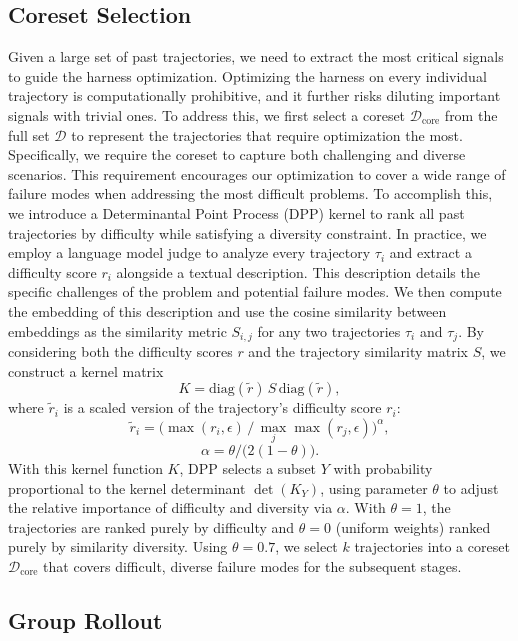 \subsection{Coreset Selection}

Given a large set of past trajectories, we need to extract the most critical signals to guide the harness optimization.
Optimizing the harness on every individual trajectory is computationally prohibitive, and it further risks diluting important signals with trivial ones.
To address this, we first select a coreset $\mathcal{D}_{\mathrm{core}}$ from the full set $\mathcal{D}$ to represent the trajectories that require optimization the most.
Specifically, we require the coreset to capture both challenging and diverse scenarios.
This requirement encourages our optimization to cover a wide range of failure modes when addressing the most difficult problems.
To accomplish this, we introduce a Determinantal Point Process (DPP) kernel \citep{kulesza2012dpp} to rank all past trajectories by difficulty while satisfying a diversity constraint.
In practice, we employ a language model judge to analyze every trajectory $\tau_i$ and extract a difficulty score $r_i$ alongside a textual description.
This description details the specific challenges of the problem and potential failure modes.
We then compute the embedding of this description and use the cosine similarity between embeddings as the similarity metric $S_{i,j}$ for any two trajectories $\tau_i$ and $\tau_j$.
By considering both the difficulty scores $r$ and the trajectory similarity matrix $S$, we construct a kernel matrix
\[
    K = \mathrm{diag}( \widetilde{r})\,S\,\mathrm{diag}( \widetilde{r}),
\]
where  $\widetilde{r}_i$ is a scaled version of the trajectory's difficulty score $r_i$:
\[
\widetilde{r}_i = \big(\max(r_i,\epsilon)\,/\,\max_j \max(r_j,\epsilon)\big)^{\alpha},
\]
\[
\alpha = \theta/\big(2(1-\theta)\big).
\]
With this kernel function $K$, DPP selects a subset $Y$ with probability proportional to the kernel determinant $\det(K_Y)$, using parameter $\theta$ to adjust the relative importance of difficulty and diversity via $\alpha$. With $\theta = 1$, the trajectories are ranked purely by difficulty and $\theta = 0$ (uniform weights) ranked purely by similarity diversity.
Using $\theta = 0.7$, we select $k$ trajectories into a coreset $\mathcal{D}_{\mathrm{core}}$ that covers difficult, diverse failure modes for the subsequent stages.

\subsection{Group Rollout}

